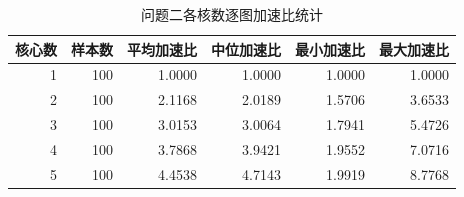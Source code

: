 \begin{table}[htbp]
\caption{问题二各核数逐图加速比统计}\label{tab:q2_mean}
\centering\normalsize
\setlength{\tabcolsep}{5pt}
\begin{tabular}{rrrrrr}
\toprule
核心数 & 样本数 & 平均加速比 & 中位加速比 & 最小加速比 & 最大加速比 \\
\midrule
1 & 100 & 1.0000 & 1.0000 & 1.0000 & 1.0000 \\
2 & 100 & 2.1168 & 2.0189 & 1.5706 & 3.6533 \\
3 & 100 & 3.0153 & 3.0064 & 1.7941 & 5.4726 \\
4 & 100 & 3.7868 & 3.9421 & 1.9552 & 7.0716 \\
5 & 100 & 4.4538 & 4.7143 & 1.9919 & 8.7768 \\
\bottomrule
\end{tabular}
\end{table}
